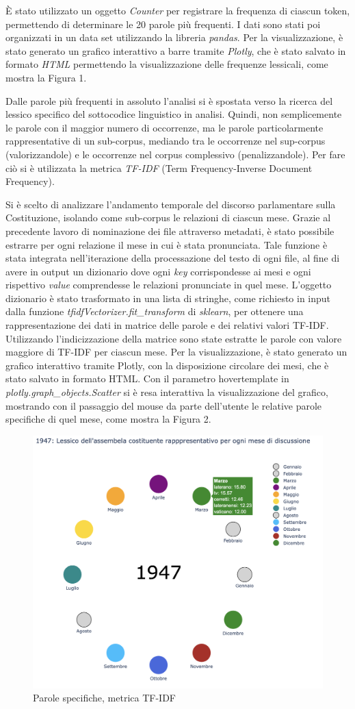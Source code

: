 \documentclass[11pt,twocolumn]{article}
\begin{document}
È stato utilizzato un oggetto \textit{Counter} per registrare la frequenza di ciascun token, permettendo di determinare le 20 parole più frequenti. I dati sono stati poi organizzati in un data set utilizzando la libreria \textit{pandas}. Per la visualizzazione, è stato generato un grafico interattivo a barre tramite \textit{Plotly}, che è stato salvato in formato \textit{HTML} permettendo la visualizzazione delle frequenze lessicali, come mostra la Figura 1.

Dalle parole più frequenti in assoluto l'analisi si è spostata verso la ricerca del lessico specifico del sottocodice linguistico in analisi. Quindi, non semplicemente le parole con il maggior numero di occorrenze, ma le parole particolarmente rappresentative di un sub-corpus, mediando tra le occorrenze nel sup-corpus (valorizzandole) e le occorrenze nel corpus complessivo (penalizzandole). Per fare ciò si è utilizzata la metrica \textit{TF-IDF} (Term Frequency-Inverse Document Frequency). 

Si è scelto di analizzare l'andamento temporale del discorso parlamentare sulla Costituzione, isolando come sub-corpus le relazioni di ciascun mese. Grazie al precedente lavoro di nominazione dei file attraverso metadati, è stato possibile estrarre per ogni relazione il mese in cui è stata pronunciata. Tale funzione è stata integrata nell'iterazione della processazione del testo di ogni file, al fine di avere in output un dizionario dove ogni \textit{key} corrispondesse ai mesi e ogni rispettivo \textit{value} comprendesse le relazioni pronunciate in quel mese. L'oggetto dizionario è stato trasformato in una lista di stringhe, come richiesto in input dalla funzione \textit{tfidfVectorizer.fit\_transform} di \textit{sklearn}, per ottenere una rappresentazione dei dati in matrice delle parole e dei relativi valori TF-IDF. Utilizzando l'indicizzazione della matrice sono state estratte le parole con valore maggiore di TF-IDF per ciascun mese.
Per la visualizzazione, è stato generato un grafico interattivo tramite Plotly, con la disposizione circolare dei mesi, che è stato salvato in formato HTML. Con il parametro hovertemplate in \textit{plotly.graph\_objects.Scatter} si è resa interattiva la visualizzazione del grafico, mostrando con il passaggio del mouse da parte dell'utente le relative parole specifiche di quel mese, come mostra la Figura 2.
\begin{figure}
    \centering
    \includegraphics[width=0.5\linewidth]{TF_IDF.png}
    \caption{Parole specifiche, metrica TF-IDF}
    \label{fig:enter-label}
\end{figure}
\end{document}
